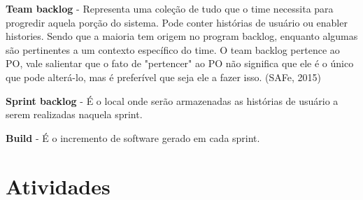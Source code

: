 \textbf{Team backlog} - Representa uma coleção de tudo que o time necessita para progredir aquela porção do sistema. Pode conter histórias de usuário ou enabler histories. Sendo que a maioria tem origem no program backlog, enquanto algumas são pertinentes a um contexto específico do time. O team backlog pertence ao PO, vale salientar que o fato de "pertencer" ao PO não significa que ele é o único que pode alterá-lo, mas é preferível que seja ele a fazer isso. (SAFe, 2015)

\textbf{Sprint backlog} - É o local onde serão armazenadas as histórias de usuário a serem realizadas naquela sprint.

\textbf{Build} - É o incremento de software gerado em cada sprint.

\section{Atividades}